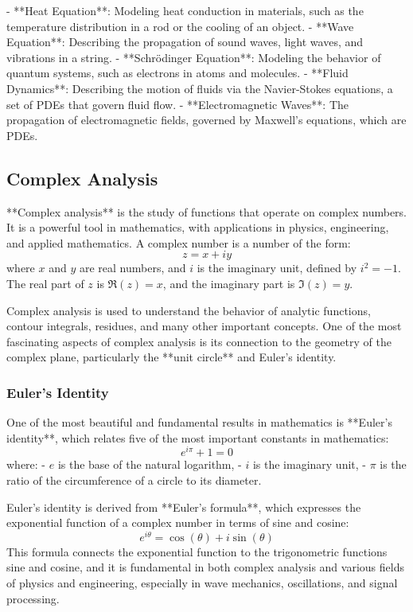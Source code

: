 \documentclass{article}
\begin{document}
- **Heat Equation**: Modeling heat conduction in materials, such as the temperature distribution in a rod or the cooling of an object.
- **Wave Equation**: Describing the propagation of sound waves, light waves, and vibrations in a string.
- **Schrödinger Equation**: Modeling the behavior of quantum systems, such as electrons in atoms and molecules.
- **Fluid Dynamics**: Describing the motion of fluids via the Navier-Stokes equations, a set of PDEs that govern fluid flow.
- **Electromagnetic Waves**: The propagation of electromagnetic fields, governed by Maxwell’s equations, which are PDEs.

\subsection{Complex Analysis}

**Complex analysis** is the study of functions that operate on complex numbers. It is a powerful tool in mathematics, with applications in physics, engineering, and applied mathematics. A complex number is a number of the form:
\[
z = x + iy
\]
where \( x \) and \( y \) are real numbers, and \( i \) is the imaginary unit, defined by \( i^2 = -1 \). The real part of \( z \) is \( \Re(z) = x \), and the imaginary part is \( \Im(z) = y \).

Complex analysis is used to understand the behavior of analytic functions, contour integrals, residues, and many other important concepts. One of the most fascinating aspects of complex analysis is its connection to the geometry of the complex plane, particularly the **unit circle** and Euler's identity.

\subsubsection*{Euler's Identity}

One of the most beautiful and fundamental results in mathematics is **Euler’s identity**, which relates five of the most important constants in mathematics:
\[
e^{i\pi} + 1 = 0
\]
where:
- \( e \) is the base of the natural logarithm,
- \( i \) is the imaginary unit,
- \( \pi \) is the ratio of the circumference of a circle to its diameter.

Euler’s identity is derived from **Euler’s formula**, which expresses the exponential function of a complex number in terms of sine and cosine:
\[
e^{i\theta} = \cos(\theta) + i\sin(\theta)
\]
This formula connects the exponential function to the trigonometric functions sine and cosine, and it is fundamental in both complex analysis and various fields of physics and engineering, especially in wave mechanics, oscillations, and signal processing.
\end{document}
